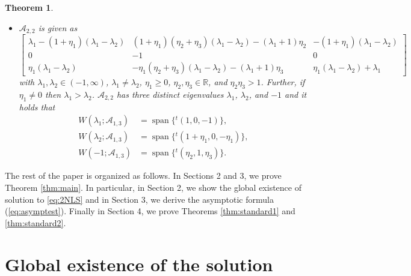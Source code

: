 \documentclass[11pt,a4paper,twosides]{amsart}
\theoremstyle{plain}
\newtheorem{theorem}{Theorem}[section]
\theoremstyle{remark}
\numberwithin{equation}{section}
\newcommand{\R}{\mathbb{R}}
\def\ge{\geqslant}
\DeclareMathOperator{\Span}{span}
\theoremstyle{definition}
\newcommand{\1}{{\bf 1}_{\{|x| < |t|\}}}
\begin{document}
\begin{theorem}
\begin{itemize}
\item $\mathscr{A}_{2,2}$ is given as
\[
	\begin{bmatrix}
	\lambda_1-(1+\eta_1)(\lambda_1-\lambda_2) & 
	(1+\eta_1)(\eta_2+\eta_3)(\lambda_1-\lambda_2) -(\lambda_1+1)\eta_2
	& -(1+\eta_1)(\lambda_1-\lambda_2) \\
	0 & -1& 0\\
	\eta_1(\lambda_1-\lambda_2) & -\eta_1(\eta_2+\eta_3)(\lambda_1-\lambda_2) -(\lambda_1+1)\eta_3  & \eta_1(\lambda_1-\lambda_2)
	+\lambda_1
	\end{bmatrix}
\]
with $\lambda_1,\lambda_2 \in (-1,\infty)$, $\lambda_1\neq\lambda_2$, $\eta_1\ge0$, $\eta_2,\eta_3\in \R$, and $\eta_2\eta_3>1$.
Further, if $\eta_1\neq0$ then $\lambda_1>\lambda_2$.
$\mathscr{A}_{2,2}$ has three distinct eigenvalues $\lambda_1$, $\lambda_2$, and $-1$ and it holds that
\begin{align*}
	W(\lambda_1;\mathscr{A}_{1,3}) 
	&= \Span \{{}^t\!(1,0,-1) \}, \\
	W(\lambda_2;\mathscr{A}_{1,3}) 
	&= \Span \{{}^t\!(1+\eta_1,0,-\eta_1) \}, \\
	W(-1;\mathscr{A}_{1,3}) 
	&= \Span \{{}^t\!(\eta_2,1,\eta_3) \}.
\end{align*}
\end{itemize}
\end{theorem}

\smallskip


The rest of the paper is organized as follows. 
In Sections 2 and 3, we prove Theorem \ref{thm:main}. 
In particular, in Section 2, we show the global existence of 
solution to \eqref{eq:2NLS} and in Section 3, we derive the 
asymptotic formula (\ref{eq:asymptest}). Finally in Section 4, 
we prove Theorems \ref{thm:standard1} and \ref{thm:standard2}.

\section{Global existence of the solution}
\end{document}
